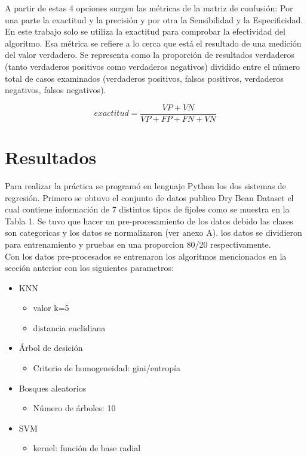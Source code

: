 \documentclass[conference]{IEEEtran}
\begin{document}
A partir de estas 4 opciones  surgen las métricas de la matriz de confusión:  Por una parte la exactitud y la precisión y por otra la Sensibilidad y la Especificidad. En este trabajo solo se utiliza la exactitud para comprobar la efectividad del algoritmo. Esa métrica se refiere a lo cerca que está el resultado de una medición del valor verdadero. Se representa como  la proporción de resultados verdaderos (tanto verdaderos positivos como verdaderos negativos) dividido entre el número total de casos examinados (verdaderos positivos, falsos positivos, verdaderos negativos, falsos negativos). 

\begin{equation}
exactitud=\frac{VP+VN}{VP+FP+FN+VN}
\end{equation}

\section{Resultados}
Para realizar la práctica se programó en lenguaje Python los dos sistemas de regresión. Primero se obtuvo el conjunto de datos publico Dry Bean Dataset el cual contiene información de 7 distintos tipos de fijoles como se muestra en la Tabla 1. Se tuvo que hacer un pre-procesamiento de los datos debido las clases son categoricas y los datos se normalizaron (ver anexo A). los datos se dividieron para entrenamiento y pruebas en una proporcion 80/20 respectivamente.\\

Con los datos pre-procesados se entrenaron los algoritmos mencionados en la sección anterior con los siguientes parametros: 
\begin{itemize}
\item KNN 
\begin{itemize}
\item valor k=5
\item distancia euclidiana
\end{itemize}
\item Árbol de desición 
\begin{itemize}
\item Criterio de homogeneidad: gini/entropía
\end{itemize}
\item Bosques aleatorios
\begin{itemize}
\item Número de árboles: 10
\end{itemize}
\item SVM
\begin{itemize}
\item kernel: función de base radial 
\end{itemize}
\end{itemize}
\end{document}
